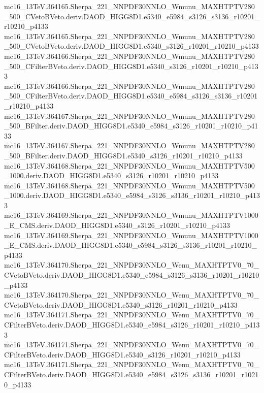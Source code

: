 \begin{footnotesize}
mc16\_13TeV.364165.Sherpa\_221\_NNPDF30NNLO\_Wmunu\_MAXHTPTV280\_500\_CVetoBVeto.deriv.DAOD\_HIGG8D1.e5340\_e5984\_s3126\_s3136\_r10201\_r10210\_p4133 \\
mc16\_13TeV.364165.Sherpa\_221\_NNPDF30NNLO\_Wmunu\_MAXHTPTV280\_500\_CVetoBVeto.deriv.DAOD\_HIGG8D1.e5340\_s3126\_r10201\_r10210\_p4133 \\
mc16\_13TeV.364166.Sherpa\_221\_NNPDF30NNLO\_Wmunu\_MAXHTPTV280\_500\_CFilterBVeto.deriv.DAOD\_HIGG8D1.e5340\_s3126\_r10201\_r10210\_p4133 \\
mc16\_13TeV.364166.Sherpa\_221\_NNPDF30NNLO\_Wmunu\_MAXHTPTV280\_500\_CFilterBVeto.deriv.DAOD\_HIGG8D1.e5340\_e5984\_s3126\_s3136\_r10201\_r10210\_p4133 \\
mc16\_13TeV.364167.Sherpa\_221\_NNPDF30NNLO\_Wmunu\_MAXHTPTV280\_500\_BFilter.deriv.DAOD\_HIGG8D1.e5340\_e5984\_s3126\_r10201\_r10210\_p4133 \\
mc16\_13TeV.364167.Sherpa\_221\_NNPDF30NNLO\_Wmunu\_MAXHTPTV280\_500\_BFilter.deriv.DAOD\_HIGG8D1.e5340\_s3126\_r10201\_r10210\_p4133 \\
mc16\_13TeV.364168.Sherpa\_221\_NNPDF30NNLO\_Wmunu\_MAXHTPTV500\_1000.deriv.DAOD\_HIGG8D1.e5340\_s3126\_r10201\_r10210\_p4133 \\
mc16\_13TeV.364168.Sherpa\_221\_NNPDF30NNLO\_Wmunu\_MAXHTPTV500\_1000.deriv.DAOD\_HIGG8D1.e5340\_e5984\_s3126\_s3136\_r10201\_r10210\_p4133 \\
mc16\_13TeV.364169.Sherpa\_221\_NNPDF30NNLO\_Wmunu\_MAXHTPTV1000\_E\_CMS.deriv.DAOD\_HIGG8D1.e5340\_s3126\_r10201\_r10210\_p4133 \\
mc16\_13TeV.364169.Sherpa\_221\_NNPDF30NNLO\_Wmunu\_MAXHTPTV1000\_E\_CMS.deriv.DAOD\_HIGG8D1.e5340\_e5984\_s3126\_s3136\_r10201\_r10210\_p4133 \\
mc16\_13TeV.364170.Sherpa\_221\_NNPDF30NNLO\_Wenu\_MAXHTPTV0\_70\_CVetoBVeto.deriv.DAOD\_HIGG8D1.e5340\_e5984\_s3126\_s3136\_r10201\_r10210\_p4133 \\
mc16\_13TeV.364170.Sherpa\_221\_NNPDF30NNLO\_Wenu\_MAXHTPTV0\_70\_CVetoBVeto.deriv.DAOD\_HIGG8D1.e5340\_s3126\_r10201\_r10210\_p4133 \\
mc16\_13TeV.364171.Sherpa\_221\_NNPDF30NNLO\_Wenu\_MAXHTPTV0\_70\_CFilterBVeto.deriv.DAOD\_HIGG8D1.e5340\_e5984\_s3126\_r10201\_r10210\_p4133 \\
mc16\_13TeV.364171.Sherpa\_221\_NNPDF30NNLO\_Wenu\_MAXHTPTV0\_70\_CFilterBVeto.deriv.DAOD\_HIGG8D1.e5340\_s3126\_r10201\_r10210\_p4133 \\
mc16\_13TeV.364171.Sherpa\_221\_NNPDF30NNLO\_Wenu\_MAXHTPTV0\_70\_CFilterBVeto.deriv.DAOD\_HIGG8D1.e5340\_e5984\_s3126\_s3136\_r10201\_r10210\_p4133 \\

\end{footnotesize}
